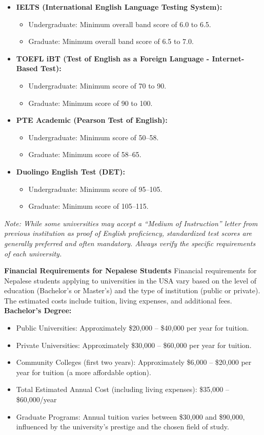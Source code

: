 \begin{itemize}
    \item \textbf{IELTS (International English Language Testing System):}
    \begin{itemize}
        \item Undergraduate: Minimum overall band score of 6.0 to 6.5.
        \item Graduate: Minimum overall band score of 6.5 to 7.0.
    \end{itemize}
    \item \textbf{TOEFL iBT (Test of English as a Foreign Language - Internet-Based Test):}
    \begin{itemize}
        \item Undergraduate: Minimum score of 70 to 90.
        \item Graduate: Minimum score of 90 to 100.
    \end{itemize}
    \item \textbf{PTE Academic (Pearson Test of English):}
    \begin{itemize}
        \item Undergraduate: Minimum score of 50--58.
        \item Graduate: Minimum score of 58--65.
    \end{itemize}
    \item \textbf{Duolingo English Test (DET):}
    \begin{itemize}
        \item Undergraduate: Minimum score of 95--105.
        \item Graduate: Minimum score of 105--115.
    \end{itemize}
\end{itemize}

\textit{Note: While some universities may accept a ``Medium of Instruction'' letter from previous institution as proof of English proficiency, standardized test scores are generally preferred and often mandatory. Always verify the specific requirements of each university.}

\textbf{Financial Requirements for Nepalese Students}
Financial requirements for Nepalese students applying to universities in the USA vary based on the level of education (Bachelor's or Master's) and the type of institution (public or private). The estimated costs include tuition, living expenses, and additional fees.
\textbf{Bachelor's Degree:}
\begin{itemize}
    \item Public Universities: Approximately \$20,000 -- \$40,000 per year for tuition.
    \item Private Universities: Approximately \$30,000 -- \$60,000 per year for tuition.
    \item Community Colleges (first two years): Approximately \$6,000 -- \$20,000 per year for tuition (a more affordable option).
    \item Total Estimated Annual Cost (including living expenses): \$35,000 -- \$60,000/year
    \item Graduate Programs: Annual tuition varies between \$30,000 and \$90,000, influenced by the university's prestige and the chosen field of study.
\end{itemize}

